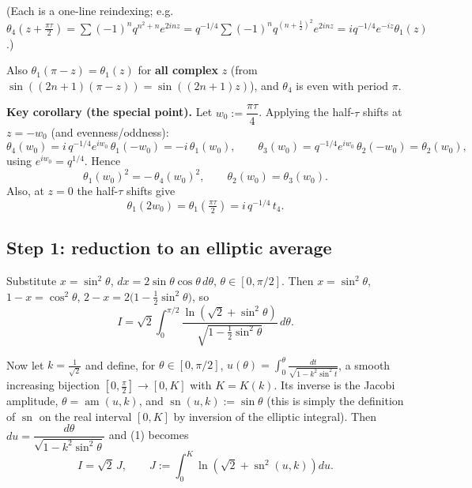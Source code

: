 \documentclass[11pt]{article}
\theoremstyle{remark}
\begin{document}
(Each is a one-line reindexing; e.g. $\theta_4(z+\tfrac{\pi\tau}2)=\sum(-1)^nq^{n^2+n}e^{2inz}=q^{-1/4}\sum(-1)^nq^{(n+\frac12)^2}e^{2inz}=iq^{-1/4}e^{-iz}\theta_1(z)$.)

Also $\theta_1(\pi-z)=\theta_1(z)$ for \textbf{all complex} $z$ (from $\sin((2n{+}1)(\pi-z))=\sin((2n{+}1)z)$), and $\theta_4$ is even with period $\pi$.

\textbf{Key corollary (the special point).} Let $w_0:=\dfrac{\pi\tau}{4}$. Applying the half-$\tau$ shifts at $z=-w_0$ (and evenness/oddness):
\[\theta_4(w_0)=i\,q^{-1/4}e^{iw_0}\,\theta_1(-w_0)=-i\,\theta_1(w_0),\qquad
\theta_3(w_0)=q^{-1/4}e^{iw_0}\,\theta_2(-w_0)=\theta_2(w_0),\]
using $e^{iw_0}=q^{1/4}$. Hence
\begin{equation*}
\theta_1(w_0)^2=-\,\theta_4(w_0)^2,\qquad \theta_2(w_0)=\theta_3(w_0). \tag{0}
\end{equation*}
Also, at $z=0$ the half-$\tau$ shifts give
\begin{equation*}
\theta_1(2w_0)=\theta_1(\tfrac{\pi\tau}2)=i\,q^{-1/4}\,t_4. \tag{0$'$}
\end{equation*}

\subsection*{Step 1: reduction to an elliptic average}

Substitute $x=\sin^2\theta$, $dx = 2\sin\theta\cos\theta\,d\theta$, $\theta\in[0,\pi/2]$. Then $x=\sin^2\theta$, $1-x=\cos^2\theta$, $2-x=2\bigl(1-\tfrac12\sin^2\theta\bigr)$, so
\begin{equation*}
I=\sqrt2\int_0^{\pi/2}\frac{\ln\!\left(\sqrt2+\sin^2\theta\right)}{\sqrt{1-\frac12\sin^2\theta}}\,d\theta. \tag{1}
\end{equation*}

Now let $k=\tfrac1{\sqrt2}$ and define, for $\theta\in[0,\pi/2]$, $u(\theta)=\int_0^\theta\frac{dt}{\sqrt{1-k^2\sin^2t}}$, a smooth increasing bijection $[0,\tfrac\pi2]\to[0,K]$ with $K=K(k)$. Its inverse is the Jacobi amplitude, $\theta=\operatorname{am}(u,k)$, and $\operatorname{sn}(u,k):=\sin\theta$ (this is simply the definition of $\operatorname{sn}$ on the real interval $[0,K]$ by inversion of the elliptic integral). Then $du=\dfrac{d\theta}{\sqrt{1-k^2\sin^2\theta}}$ and (1) becomes
\begin{equation*}
I=\sqrt2\,J,\qquad J:=\int_0^K \ln\!\left(\sqrt2+\operatorname{sn}^2(u,k)\right)du. \tag{2}
\end{equation*}
\end{document}
